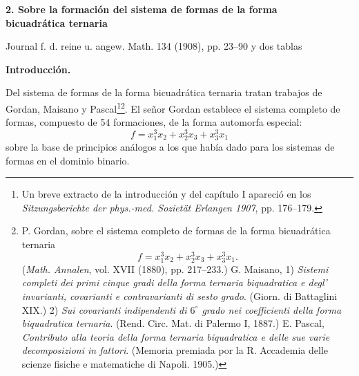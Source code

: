 \documentclass[11pt]{article}
\begin{document}
\clearpage

\begin{center}
{\Large\bfseries 2. Sobre la formación del sistema de formas de la forma\\ bicuadrática ternaria}\par
\vspace{1.5em}
Journal f. d. reine u. angew. Math. 134 (1908), pp. 23--90 y dos tablas
\end{center}

\vspace{3em}

\begin{center}
\textbf{Introducción.}
\end{center}

Del sistema de formas de la forma bicuadrática ternaria tratan trabajos de Gordan, Maisano y Pascal\footnote{Un breve extracto de la introducción y del capítulo I apareció en los \emph{Sitzungsberichte der phys.-med. Sozietät Erlangen 1907}, pp. 176--179.}\footnote{P. Gordan, sobre el sistema completo de formas de la forma bicuadrática ternaria
\[
f=x_1^3x_2+x_2^3x_3+x_3^3x_1.
\]
(\emph{Math. Annalen}, vol. XVII (1880), pp. 217--233.)
G. Maisano, 1) \emph{Sistemi completi dei primi cinque gradi della forma ternaria biquadratica e degl' invarianti, covarianti e contravarianti di sesto grado}. (Giorn. di Battaglini XIX.)
2) \emph{Sui covarianti indipendenti di $6^\circ$ grado nei coefficienti della forma biquadratica ternaria}. (Rend. Circ. Mat. di Palermo I, 1887.)
E. Pascal, \emph{Contributo alla teoria della forma ternaria biquadratica e delle sue varie decomposizioni in fattori}. (Memoria premiada por la R. Accademia delle scienze fisiche e matematiche di Napoli. 1905.)}. El señor Gordan establece el sistema completo de formas, compuesto de 54 formaciones, de la forma automorfa especial:
\[
f=x_1^3x_2+x_2^3x_3+x_3^3x_1
\]
sobre la base de principios análogos a los que había dado para los sistemas de formas en el dominio binario.
\end{document}
